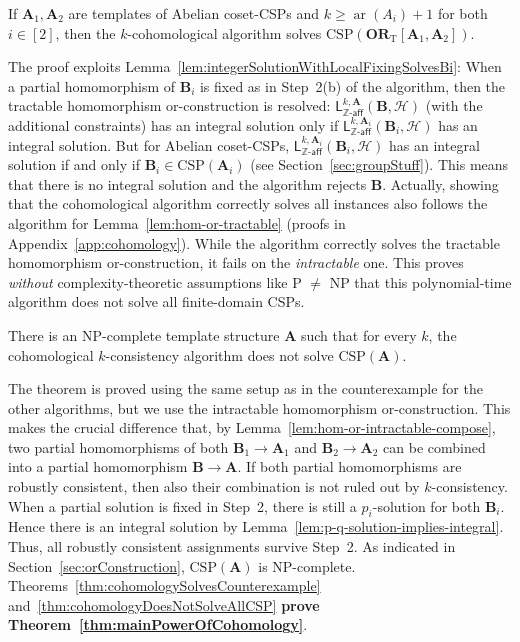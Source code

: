 \documentclass[a4paper,english, thm-restate]{lipics-v2021}
\newcommand{\ZZ}{\mathbb{Z}}
\newcommand{\arity}[1]{\operatorname*{ar}(#1)}
\newcommand{\StructA}{\mathbf{A}}
\newcommand{\StructB}{\mathbf{B}}
\newcommand{\CSP}[1]{\mathrm{CSP}(#1)}
\newcommand{\leqs}{\mathsf{L}}
\newcommand{\zafkleq}[4]{\leqs^{#1,#2}_{\ZZ\mathsf{\text{-}aff}}(#3,#4)}
\newcommand{\Hh}{\mathcal{H}}
\newcommand{\ORT}[1]{\mathbf{OR}_\text{T}[#1]}
\begin{document}
	\begin{theorem}[restate=cohomologySolvesCounterexample, name=]
		\label{thm:cohomologySolvesCounterexample}
		If $\StructA_1, \StructA_2$ are templates of Abelian coset-CSPs
		and $k\geq \arity{A_i}+1$ for both $i\in[2]$,
		then the $k$-cohomological algorithm solves $\CSP{\ORT{\StructA_1,\StructA_2}}$.
	\end{theorem}
	\noindent The proof  exploits Lemma~\ref{lem:integerSolutionWithLocalFixingSolvesBi}:
	When a partial homomorphism of $\StructB_i$ is fixed as in Step~2(b) of the algorithm,
	then the tractable homomorphism or-construction is resolved:
	$\zafkleq{k}{\StructA}{\StructB}{\Hh}$ (with the additional constraints)
	has an integral solution only if $\zafkleq{k}{\StructA_i}{\StructB_i}{\Hh}$
	has an integral solution.
	But for Abelian coset-CSPs, $\zafkleq{k}{\StructA_i}{\StructB_i}{\Hh}$ has an integral solution if and only if $\StructB_i \in \CSP{\StructA_i}$ (see Section~\ref{sec:groupStuff}).
	This means that there is no integral solution
	and the algorithm rejects $\StructB$.
	Actually, showing that the cohomological algorithm correctly solves all instances 
	also follows the algorithm for Lemma~\ref{lem:hom-or-tractable} (proofs in Appendix~\ref{app:cohomology}).
	While the algorithm correctly solves the tractable homomorphism or-construction,
	it fails on the \emph{intractable} one. This proves \emph{without} complexity-theoretic assumptions like P $\neq$ NP that this polynomial-time algorithm does not solve all finite-domain CSPs.
	
	\begin{theorem}[restate=cohomologyDoesNotSolveAllCSP, name =]
		\label{thm:cohomologyDoesNotSolveAllCSP}
		There is an NP-complete template structure $\StructA$ such that for every $k$,
		the cohomological $k$-consistency algorithm does not solve $\CSP{\StructA}$.
	\end{theorem}
	\noindent The theorem is proved using the same setup as in the counterexample for the other algorithms, but
	we use the intractable homomorphism or-construction.
	This makes the crucial difference that, by Lemma~\ref{lem:hom-or-intractable-compose},
	two partial homomorphisms of both $\StructB_1\to\StructA_1$ and $\StructB_2\to\StructA_2$
	can be combined into a partial homomorphism $\StructB\to\StructA$.
	If both partial homomorphisms are robustly consistent, then also their combination is not ruled out by $k$-consistency.
	When a partial solution is fixed in Step~2,
	there is still a $p_i$-solution for both $\StructB_i$.
	Hence there is an integral solution by Lemma~\ref{lem:p-q-solution-implies-integral}.
	Thus, all robustly consistent assignments survive Step~2.
	As indicated in Section~\ref{sec:orConstruction}, $\CSP{\StructA}$ is NP-complete.
	Theorems~\ref{thm:cohomologySolvesCounterexample} and~\ref{thm:cohomologyDoesNotSolveAllCSP} \textbf{prove Theorem~\ref{thm:mainPowerOfCohomology}}.
	
\end{document}
